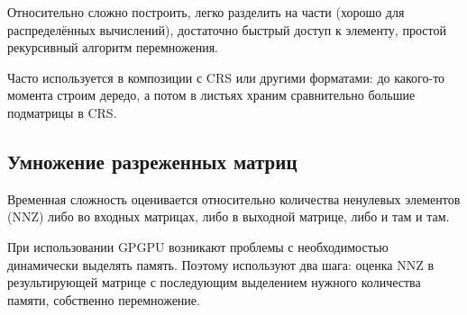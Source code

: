 {
}

Относительно сложно построить, легко разделить на части (хорошо для распределённых вычислений), достаточно быстрый доступ к элементу, простой рекурсивный алгоритм перемножения.

Часто используется в композиции с CRS или другими форматами: до какого-то момента строим дередо, а потом в листьях храним сравнительно большие подматрицы в CRS.

\subsection{Умножение разреженных матриц}

Временная сложность оценивается относительно количества ненулевых элементов (NNZ) либо во входных матрицах, либо в выходной матрице, либо и там и там.

При использовании GPGPU возникают проблемы с необходимостью динамически выделять память. Поэтому используют два шага: оценка NNZ  в результирующей матрице с последующим выделением нужного количества памяти, собственно перемножение. 